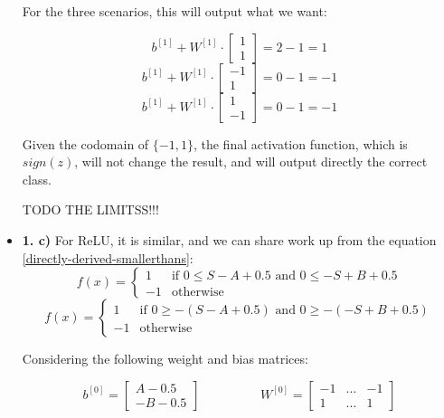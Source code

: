 \documentclass[12pt]{article}
\begin{document}
\begin{itemize}
        For the three scenarios, this will output what we want:

        \[
            b^{[1]}+W^{[1]}\cdot
            \begin{bmatrix}
                1 \\
                1
            \end{bmatrix}
            =
            2 - 1 = 1
        \]
        \[
            b^{[1]}+W^{[1]}\cdot
            \begin{bmatrix}
                -1 \\
                1
            \end{bmatrix}
            =
            0 - 1 = -1
        \]
        \[
            b^{[1]}+W^{[1]}\cdot
            \begin{bmatrix}
                1 \\
                -1
            \end{bmatrix}
            =
            0 - 1 = -1
        \]

        Given the codomain of $\{-1,1\}$, the final activation function, which is $sign(z)$, will not change the result, and will output directly the correct class.

        TODO THE LIMITSS!!!

    \item \textbf{1. c)} For ReLU, it is similar, and we can share work up from the equation \ref{directly-derived-smallerthans}:
        \[
            f(x) =
            \begin{cases}
                1 & \text{if } 0 \leq S -A+0.5 \text{ and } 0 \leq -S+B+0.5 \\
                -1 & \text{otherwise}
            \end{cases}
        \]
        \begin{equation}
            f(x) =
            \begin{cases}
                1 & \text{if } 0 \geq -(S-A+0.5) \text{ and } 0 \geq -(-S+B+0.5) \\
                -1 & \text{otherwise}
            \end{cases}
            \label{directly-derived-greaterthans}
\end{equation}



        Considering the following weight and bias matrices:

        \[
            b^{[0]} = \begin{bmatrix}
                A-0.5 \\
                -B-0.5
            \end{bmatrix}
            \hspace{2cm}
            W^{[0]} = \begin{bmatrix}
                -1 & \hdots & -1 \\
                1 & \hdots & 1
            \end{bmatrix}
        \]


\end{itemize}
\end{document}
